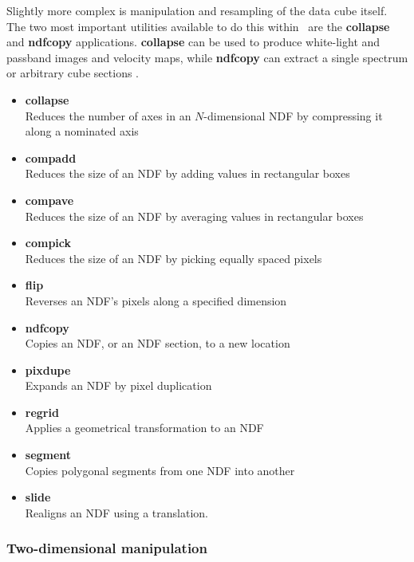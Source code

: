 \documentclass[twoside,11pt]{article}
\newcommand{\htmlref}[2]{#1}
\newcommand{\xref}[3]{#1}
\begin{document}
{Slightly more complex is manipulation and resampling of the data cube
itself.  The two most important utilities available to do this within
\KAPPA\ are the \xref{{\bf collapse}}{sun95}{COLLAPSE} and
\xref{{\bf ndfcopy}}{sun95}{NDFCOPY} applications.  {\bf collapse} can
be used to produce \htmlref{white-light and passband}{sc16_vis} images and velocity maps, while {\bf ndfcopy} can extract a single spectrum or 
\htmlref{arbitrary cube sections}{sc16_vis} .

\begin{itemize}
\item{\xref{{\bf collapse}}{sun95}{COLLAPSE}}\\
Reduces the number of axes in an $N$-dimensional NDF by compressing it along a nominated axis 
\item{\xref{{\bf compadd}}{sun95}{COMPADD}}\\
Reduces the size of an NDF by adding values in rectangular boxes 
\item{\xref{{\bf compave}}{sun95}{COMPAVE}}\\
Reduces the size of an NDF by averaging values in rectangular boxes 
\item{\xref{{\bf compick}}{sun95}{COMPICK}}\\
Reduces the size of an NDF by picking equally spaced pixels 
\item{\xref{{\bf flip}}{sun95}{FLIP}}\\
Reverses an NDF's pixels along a specified dimension 
\item{\xref{{\bf ndfcopy}}{sun95}{NDFCOPY}}\\
Copies an NDF, or an NDF section, to a new location 
\item{\xref{{\bf pixdupe}}{sun95}{PIXDUPE}}\\
Expands an NDF by pixel duplication 
\item{\xref{{\bf regrid}}{sun95}{REGRID}}\\
Applies a geometrical transformation to an NDF
\item{\xref{{\bf segment}}{sun95}{SEGMENT}}\\
Copies polygonal segments from one NDF into another 
\item{\xref{{\bf slide}}{sun95}{SLIDE}}\\
Realigns an NDF using a translation.
\end{itemize}

\subsubsection{Two-dimensional manipulation}

}
\end{document}
